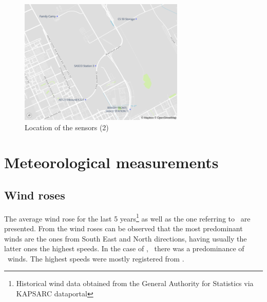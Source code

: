 \documentclass[12pt, oneside]{book}
\begin{document}
{\begin{figure}[H]
\centering
\includegraphics[width=0.7\textwidth, keepaspectratio]{map2.png}
\caption{Location of the sensors (2)}\label{image4}
\end{figure}}

\chapter{Meteorological measurements}


\section{Wind roses}

The average wind rose for the last 5 years\footnote{Historical wind data obtained from the General Authority for Statistics via KAPSARC dataportal} as well as the one referring to  \monthyear \ are presented. From the wind roses can be observed that the most predominant winds are the ones from South East and North directions, having usually the latter ones the highest speeds. In the case of \monthyear , \ there was a predominance of \freqWinds\ winds. The highest speeds were mostly registered from \maxWind .
\end{document}
